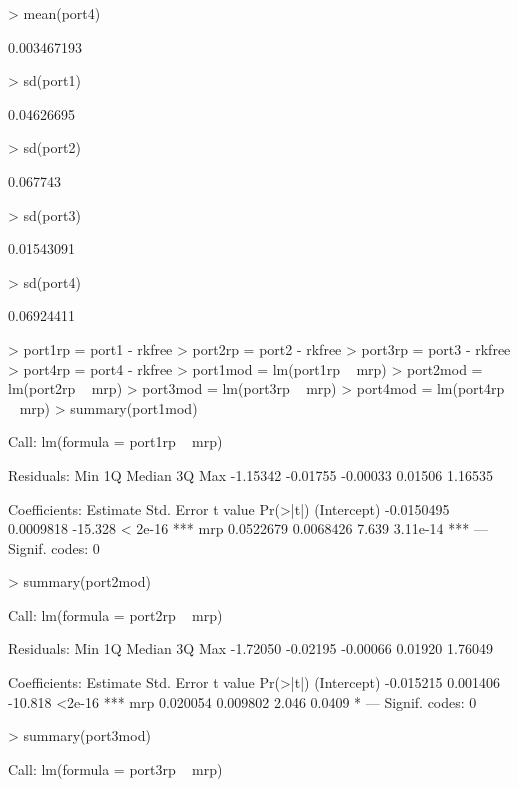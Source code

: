 \documentclass[12pt, a14paper, lithuanian]{article}
\begin{document}
\begin{Schunk}
\begin{Soutput}
\end{Soutput}
\begin{Sinput}
> mean(port4)
\end{Sinput}
\begin{Soutput}
[1] 0.003467193
\end{Soutput}
\begin{Sinput}
> sd(port1)
\end{Sinput}
\begin{Soutput}
[1] 0.04626695
\end{Soutput}
\begin{Sinput}
> sd(port2)
\end{Sinput}
\begin{Soutput}
[1] 0.067743
\end{Soutput}
\begin{Sinput}
> sd(port3)
\end{Sinput}
\begin{Soutput}
[1] 0.01543091
\end{Soutput}
\begin{Sinput}
> sd(port4)
\end{Sinput}
\begin{Soutput}
[1] 0.06924411
\end{Soutput}
\begin{Sinput}
> port1rp = port1 - rkfree
> port2rp = port2 - rkfree
> port3rp = port3 - rkfree
> port4rp = port4 - rkfree
> port1mod = lm(port1rp ~ mrp)
> port2mod = lm(port2rp ~ mrp)
> port3mod = lm(port3rp ~ mrp)
> port4mod = lm(port4rp ~ mrp)
> summary(port1mod)
\end{Sinput}
\begin{Soutput}
Call:
lm(formula = port1rp ~ mrp)

Residuals:
     Min       1Q   Median       3Q      Max 
-1.15342 -0.01755 -0.00033  0.01506  1.16535 

Coefficients:
              Estimate Std. Error t value Pr(>|t|)    
(Intercept) -0.0150495  0.0009818 -15.328  < 2e-16 ***
mrp          0.0522679  0.0068426   7.639 3.11e-14 ***
---
Signif. codes:  0 
\end{Soutput}
\begin{Sinput}
> summary(port2mod)
\end{Sinput}
\begin{Soutput}
Call:
lm(formula = port2rp ~ mrp)

Residuals:
     Min       1Q   Median       3Q      Max 
-1.72050 -0.02195 -0.00066  0.01920  1.76049 

Coefficients:
             Estimate Std. Error t value Pr(>|t|)    
(Intercept) -0.015215   0.001406 -10.818   <2e-16 ***
mrp          0.020054   0.009802   2.046   0.0409 *  
---
Signif. codes:  0 
\end{Soutput}
\begin{Sinput}
> summary(port3mod)
\end{Sinput}
\begin{Soutput}
Call:
lm(formula = port3rp ~ mrp)


\end{Soutput}
\end{Schunk}
\end{document}

